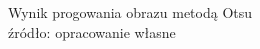 \documentclass[eng,oneside]{mgr}
\begin{document}
\begin{figure}[htbp]
\centering
{}
\quad
{}
\renewcommand\figurename{Przykład}
\caption{Wynik progowania obrazu metodą Otsu\\ 
źródło: opracowanie własne}
\end{figure}
\end{document}
